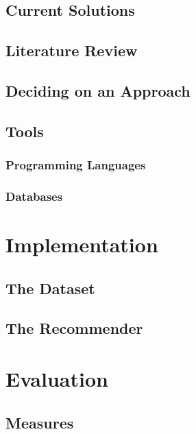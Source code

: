 \documentclass[a4paper,12pt,twoside,notitlepage,draft]{report}
\begin{document}
\section{Current Solutions}

\section{Literature Review}

\section{Deciding on an Approach}

\section{Tools}

 \subsection{Programming Languages}

 \subsection{Databases}

\chapter{Implementation}

\section{The Dataset}

\section{The Recommender}

\chapter{Evaluation}

\section{Measures}
\end{document}

